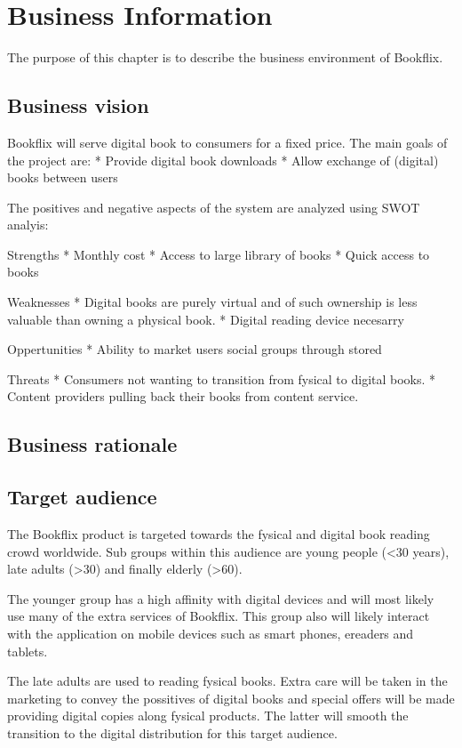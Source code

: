 \chapter*{Business Information}

The purpose of this chapter is to describe the business environment of Bookflix.

\section{Business vision}
Bookflix will serve digital book to consumers for a fixed price.
The main goals of the project are:
* Provide digital book downloads
* Allow exchange of (digital) books between users

The positives and negative aspects of the system are analyzed using SWOT analyis:

Strengths
* Monthly cost 
* Access to large library of books
* Quick access to books

Weaknesses
* Digital books are purely virtual and of such ownership is less valuable than owning a physical book.
* Digital reading device necesarry

Oppertunities
* Ability to market users social groups through stored 

Threats
* Consumers not wanting to transition from fysical to digital books.
* Content providers pulling back their books from content service.


\section{Business rationale}


\section{Target audience}
The Bookflix product is targeted towards the fysical and digital book reading crowd worldwide. Sub groups within this audience are young people (<30 years), late adults (>30) and finally elderly (>60).

The younger group has a high affinity with digital devices and will most likely use many of the extra services of Bookflix.
This group also will likely interact with the application on mobile devices such as smart phones, ereaders and tablets.

The late adults are used to reading fysical books.
Extra care will be taken in the marketing to convey the possitives of digital books and special offers will be made providing digital copies along fysical products.
The latter will smooth the transition to the digital distribution for this target audience.

